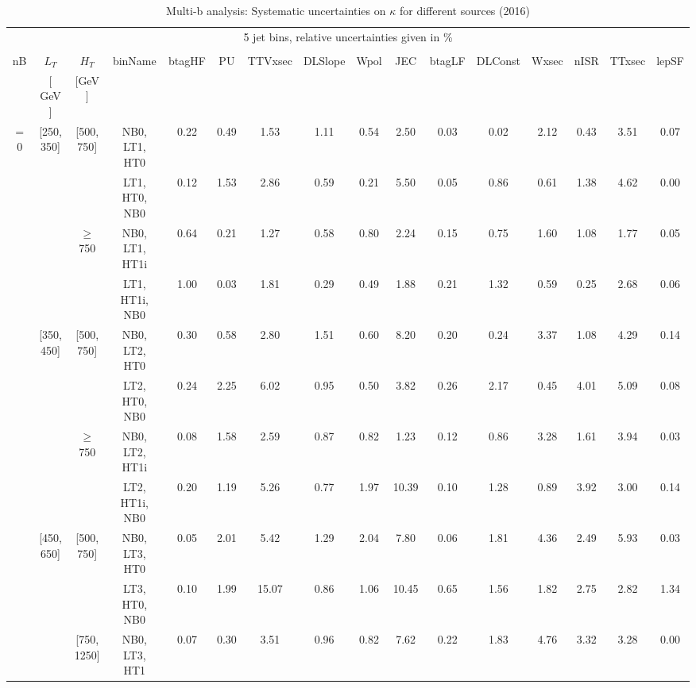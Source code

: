  \begin{sidewaystable}[ht] 
 \tiny 
\caption{Multi-b analysis: Systematic uncertainties on $\kappa$ for different sources (2016)} 
\begin{center} 
\label{tab:sysTable} 
\begin{tabular}{|c | c | c | c | c | c | c | c | c | c | c | c | c | c | c | c | } 
\hline 
\multicolumn{16}{|c|}{5 jet bins, relative uncertainties given in \%} \\ 
\multicolumn{16}{|c|}{} \\ \hline 
nB &  $L_T$ & $H_T$ & binName & btagHF & PU & TTVxsec & DLSlope & Wpol & JEC & btagLF & DLConst & Wxsec & nISR & TTxsec & lepSF  \\ 
   & $[$ GeV $]$  &  $[$GeV$]$  &  &  &  &  &  &  &  &  &  &  &  &  &   \\ \hline 
\cline{1-16} $=$ 0 & [250, 350] & [500, 750]&NB0, LT1, HT0 & 0.22 & 0.49 & 1.53 & 1.11 & 0.54 & 2.50 & 0.03 & 0.02 & 2.12 & 0.43 & 3.51 & 0.07 \\ 
  &  &  &LT1, HT0, NB0 & 0.12 & 1.53 & 2.86 & 0.59 & 0.21 & 5.50 & 0.05 & 0.86 & 0.61 & 1.38 & 4.62 & 0.00 \\ 
\cline{3-16}  & & $\geq$ 750 &NB0, LT1, HT1i & 0.64 & 0.21 & 1.27 & 0.58 & 0.80 & 2.24 & 0.15 & 0.75 & 1.60 & 1.08 & 1.77 & 0.05 \\ 
  &  &  &LT1, HT1i, NB0 & 1.00 & 0.03 & 1.81 & 0.29 & 0.49 & 1.88 & 0.21 & 1.32 & 0.59 & 0.25 & 2.68 & 0.06 \\ 
\cline{2-16}   & [350, 450] & [500, 750]&NB0, LT2, HT0 & 0.30 & 0.58 & 2.80 & 1.51 & 0.60 & 8.20 & 0.20 & 0.24 & 3.37 & 1.08 & 4.29 & 0.14 \\ 
  &  &  &LT2, HT0, NB0 & 0.24 & 2.25 & 6.02 & 0.95 & 0.50 & 3.82 & 0.26 & 2.17 & 0.45 & 4.01 & 5.09 & 0.08 \\ 
\cline{3-16}  & & $\geq$ 750 &NB0, LT2, HT1i & 0.08 & 1.58 & 2.59 & 0.87 & 0.82 & 1.23 & 0.12 & 0.86 & 3.28 & 1.61 & 3.94 & 0.03 \\ 
  &  &  &LT2, HT1i, NB0 & 0.20 & 1.19 & 5.26 & 0.77 & 1.97 & 10.39 & 0.10 & 1.28 & 0.89 & 3.92 & 3.00 & 0.14 \\ 
\cline{2-16}   & [450, 650] & [500, 750]&NB0, LT3, HT0 & 0.05 & 2.01 & 5.42 & 1.29 & 2.04 & 7.80 & 0.06 & 1.81 & 4.36 & 2.49 & 5.93 & 0.03 \\ 
  &  &  &LT3, HT0, NB0 & 0.10 & 1.99 & 15.07 & 0.86 & 1.06 & 10.45 & 0.65 & 1.56 & 1.82 & 2.75 & 2.82 & 1.34 \\ 
\cline{3-16}  & & [750, 1250] &NB0, LT3, HT1 & 0.07 & 0.30 & 3.51 & 0.96 & 0.82 & 7.62 & 0.22 & 1.83 & 4.76 & 3.32 & 3.28 & 0.00 \\ 

\end{tabular}
\end{center}
\end{sidewaystable}
